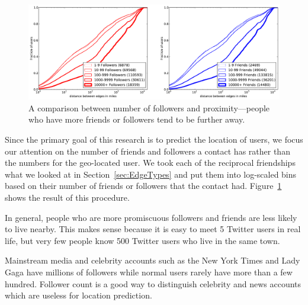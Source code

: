 \begin{figure}[tb]
\centering
\includegraphics[width=\linewidth]{figures/edge_counts.pdf}
\caption{
A comparison between number of followers and proximity---people who have more
friends or followers tend to be further away.
}
\label{fig:EdgeCounts}
\end{figure}

Since the primary goal of this research is to predict the location of users, we
focus our attention on the number of friends and followers a contact has rather
than the numbers for the geo-located user.
We took each of the reciprocal friendships what we looked at in
Section~\ref{sec:EdgeTypes} and put them into log-scaled bins based on their
number of friends or followers that the contact had.
Figure~\ref{fig:EdgeCounts} shows the result of this procedure.

In general, people who are more promiscuous followers and friends are less
likely to live nearby. This makes sense because it is easy to meet 5 Twitter
users in real life, but very few people know 500 Twitter users who live in the
same town.

Mainstream media and celebrity accounts such as the New York Times and Lady
Gaga have millions of followers while normal users rarely have more than a few
hundred.
Follower count is a good way to distinguish celebrity and news accounts which
are useless for location prediction.


